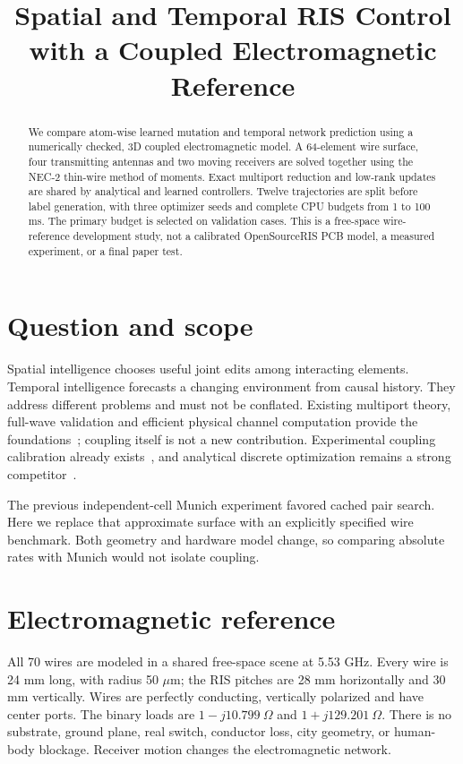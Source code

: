 \documentclass[conference]{IEEEtran}
\title{Spatial and Temporal RIS Control with a Coupled Electromagnetic Reference}
\author{\IEEEauthorblockN{Atom-wise RIS Research}\IEEEauthorblockA{Development pilot --- 24 October 2026}}
\begin{document}
\maketitle
\begin{abstract}
We compare atom-wise learned mutation and temporal network prediction using a numerically checked, 3D coupled electromagnetic model. A 64-element wire surface, four transmitting antennas and two moving receivers are solved together using the NEC-2 thin-wire method of moments. Exact multiport reduction and low-rank updates are shared by analytical and learned controllers. Twelve trajectories are split before label generation, with three optimizer seeds and complete CPU budgets from 1 to 100 ms. The primary budget is selected on validation cases. This is a free-space wire-reference development study, not a calibrated OpenSourceRIS PCB model, a measured experiment, or a final paper test.
\end{abstract}
\section{Question and scope}
Spatial intelligence chooses useful joint edits among interacting elements. Temporal intelligence forecasts a changing environment from causal history. They address different problems and must not be conflated. Existing multiport theory, full-wave validation and efficient physical channel computation provide the foundations~\cite{nerini,abrardo,prod}; coupling itself is not a new contribution. Experimental coupling calibration already exists~\cite{zheng}, and analytical discrete optimization remains a strong competitor~\cite{hammami}.

The previous independent-cell Munich experiment favored cached pair search. Here we replace that approximate surface with an explicitly specified wire benchmark. Both geometry and hardware model change, so comparing absolute rates with Munich would not isolate coupling.

\section{Electromagnetic reference}
All 70 wires are modeled in a shared free-space scene at 5.53 GHz. Every wire is 24 mm long, with radius 50 $\mu$m; the RIS pitches are 28 mm horizontally and 30 mm vertically. Wires are perfectly conducting, vertically polarized and have center ports. The binary loads are $1-j10.799~\Omega$ and $1+j129.201~\Omega$. There is no substrate, ground plane, real switch, conductor loss, city geometry, or human-body blockage. Receiver motion changes the electromagnetic network.
\end{document}
